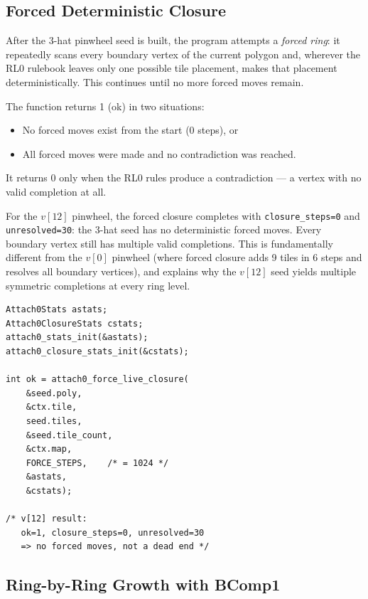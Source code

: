 \documentclass[10pt,a4paper]{article}
\let\polysubsection\subsection
\renewcommand\subsection{\needspace{0.12\textheight}\polysubsection}
\newcommand{\code}[1]{\texttt{\small #1}}
\begin{document}
\subsection{Forced Deterministic Closure}

\begin{tcolorbox}[dualbox, title={\code{attach0\_force\_live\_closure}}]
  After the 3-hat pinwheel seed is built, the program attempts a
  \emph{forced ring}: it repeatedly scans every boundary vertex of the
  current polygon and, wherever the RL0 rulebook leaves only one possible
  tile placement, makes that placement deterministically.  This continues
  until no more forced moves remain.

  The function returns 1 (ok) in two situations:
  \begin{itemize}
    \item No forced moves exist from the start (0 steps), or
    \item All forced moves were made and no contradiction was reached.
  \end{itemize}
  It returns 0 only when the RL0 rules produce a contradiction — a
  vertex with no valid completion at all.

  For the $v[12]$ pinwheel, the forced closure completes with
  \code{closure\_steps=0} and \code{unresolved=30}: the 3-hat seed has
  no deterministic forced moves.  Every boundary vertex still has multiple
  valid completions.  This is fundamentally different from the $v[0]$
  pinwheel (where forced closure adds 9 tiles in 6 steps and resolves all
  boundary vertices), and explains why the $v[12]$ seed yields multiple
  symmetric completions at every ring level.
\tcblower
\begin{verbatim}
Attach0Stats astats;
Attach0ClosureStats cstats;
attach0_stats_init(&astats);
attach0_closure_stats_init(&cstats);

int ok = attach0_force_live_closure(
    &seed.poly,
    &ctx.tile,
    seed.tiles,
    &seed.tile_count,
    &ctx.map,
    FORCE_STEPS,    /* = 1024 */
    &astats,
    &cstats);

/* v[12] result:
   ok=1, closure_steps=0, unresolved=30
   => no forced moves, not a dead end */
\end{verbatim}
\end{tcolorbox}

\subsection{Ring-by-Ring Growth with BComp1}
\end{document}
